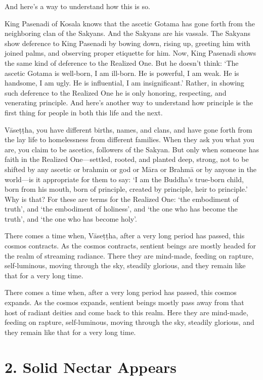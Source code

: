 \documentclass[12pt,openany]{book}%
\begin{document}
And here’s a way to understand how this is so. 

King Pasenadi of Kosala knows that the ascetic Gotama has gone forth from the neighboring clan of the Sakyans. And the Sakyans are his vassals. The Sakyans show deference to King Pasenadi by bowing down, rising up, greeting him with joined palms, and observing proper etiquette for him. Now, King Pasenadi shows the same kind of deference to the Realized One. But he doesn’t think: ‘The ascetic Gotama is well-born, I am ill-born. He is powerful, I am weak. He is handsome, I am ugly. He is influential, I am insignificant.’ Rather, in showing such deference to the Realized One he is only honoring, respecting, and venerating principle. And here’s another way to understand how principle is the first thing for people in both this life and the next. 

\textsanskrit{Vāseṭṭha}, you have different births, names, and clans, and have gone forth from the lay life to homelessness from different families. When they ask you what you are, you claim to be ascetics, followers of the Sakyan. But only when someone has faith in the Realized One—settled, rooted, and planted deep, strong, not to be shifted by any ascetic or brahmin or god or \textsanskrit{Māra} or \textsanskrit{Brahmā} or by anyone in the world—is it appropriate for them to say: ‘I am the Buddha’s true-born child, born from his mouth, born of principle, created by principle, heir to principle.’ Why is that? For these are terms for the Realized One: ‘the embodiment of truth’, and ‘the embodiment of holiness’, and ‘the one who has become the truth’, and ‘the one who has become holy’. 

There comes a time when, \textsanskrit{Vāseṭṭha}, after a very long period has passed, this cosmos contracts. As the cosmos contracts, sentient beings are mostly headed for the realm of streaming radiance. There they are mind-made, feeding on rapture, self-luminous, moving through the sky, steadily glorious, and they remain like that for a very long time. 

There comes a time when, after a very long period has passed, this cosmos expands. As the cosmos expands, sentient beings mostly pass away from that host of radiant deities and come back to this realm. Here they are mind-made, feeding on rapture, self-luminous, moving through the sky, steadily glorious, and they remain like that for a very long time. 

\section*{2. Solid Nectar Appears }
\end{document}
